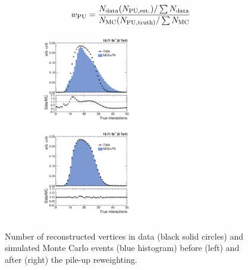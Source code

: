 \begin{equation}
\label{eq:reweigh}
 {w_{\rm PU} = \frac {N_{\rm data} (N_{\rm PU,est.})/\sum N_{\rm data}} {N_{\rm MC} (N_{\rm PU,truth)}/\sum N_{\rm MC}}}
\end{equation}

\begin{figure}[ht]
 \begin{center}
 \hspace*{-5mm}\includegraphics[width=0.51\textwidth]{Plots_HT_2_150/Nvertices.pdf}%
 ~~\includegraphics[width=0.51\textwidth]{Plots_HT_2_150/Nvertices_weight.pdf}
 \caption{Number of reconstructed vertices in data (black solid circles) and simulated Monte Carlo events (blue histogram) before (left) and after (right) the pile-up reweighting.}
 \label{fig:pileup}
 \end{center}
\end{figure}

